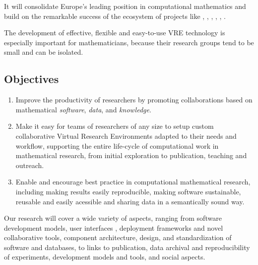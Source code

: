 \documentclass[a4paper,11pt]{article}
\begin{document}
It will consolidate Europe's leading position in computational
mathematics and build on the remarkable success of the ecosystem of
projects like \GAP, \Python, \Sage, \Pari, \Singular, \LMFDB.

The development of effective, flexible and easy-to-use VRE technology
is especially important for mathematicians, because their research
groups tend to be small and can be isolated.


\subsection{Objectives}
\label{sect:objectives}





\begin{enumerate}
\item \label{aim:collaboration} Improve the productivity of
  researchers by promoting collaborations based on mathematical
  \emph{software}, \emph{data}, and \emph{knowledge}.
\item \label{aim:vre} Make it easy for teams of
  researchers of any size to setup custom collaborative Virtual Research
  Environments adapted to their needs and workflow, supporting the
  entire life-cycle of computational work in mathematical research,
  from initial exploration to publication, teaching and outreach.
\item \label{aim:sharing} Enable and encourage best practice in
  computational mathematical research, including making results
  easily reproducible, making software sustainable, reusable and
  easily acessible and
  sharing data in a semantically sound way.
\end{enumerate}



Our research will cover a wide variety of aspects, ranging from
software development models, user interfaces , deployment frameworks and novel collaborative tools,
component architecture, design, and standardization of software
 and databases, to links to publication, data archival
and reproducibility of experiments, development models and tools, and
social aspects.
\end{document}
